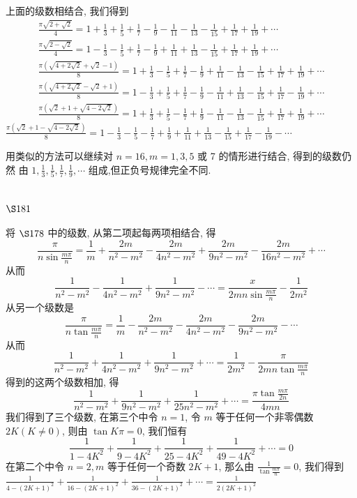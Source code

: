 上面的级数相结合, 我们得到
\[
\begin{gathered}
\frac{\pi \sqrt{2+\sqrt{2}}}{4}=1+\frac{1}{3}+\frac{1}{5}+\frac{1}{7}-\frac{1}{9}-\frac{1}{11}-\frac{1}{13}-\frac{1}{15}+\frac{1}{17}+\frac{1}{19}+\cdots \\
\frac{\pi \sqrt{2-\sqrt{2}}}{4}=1-\frac{1}{3}-\frac{1}{5}+\frac{1}{7}-\frac{1}{9}+\frac{1}{11}+\frac{1}{13}-\frac{1}{15}+\frac{1}{17}+\frac{1}{19}+\cdots \\
\frac{\pi(\sqrt{4+2 \sqrt{2}}+\sqrt{2}-1)}{8}=1+\frac{1}{3}-\frac{1}{5}+\frac{1}{7}-\frac{1}{9}+\frac{1}{11}-\frac{1}{13}-\frac{1}{15}+\frac{1}{17}+\frac{1}{19}+\cdots \\
\frac{\pi(\sqrt{4+2 \sqrt{2}}-\sqrt{2}+1)}{8}=1-\frac{1}{3}+\frac{1}{5}+\frac{1}{7}-\frac{1}{9}-\frac{1}{11}+\frac{1}{13}-\frac{1}{15}+\frac{1}{17}-\frac{1}{19}+\cdots \\
\frac{\pi(\sqrt{2}+1+\sqrt{4-2 \sqrt{2}})}{8}=1+\frac{1}{3}+\frac{1}{5}-\frac{1}{7}+\frac{1}{9}-\frac{1}{11}-\frac{1}{13}-\frac{1}{15}+\frac{1}{17}+\frac{1}{19}+\cdots
\end{gathered}
\]
$\frac{\pi(\sqrt{2}+1-\sqrt{4-2 \sqrt{2}})}{8}=1-\frac{1}{3}-\frac{1}{5}-\frac{1}{7}+\frac{1}{9}+\frac{1}{11}+\frac{1}{13}-\frac{1}{15}+\frac{1}{17}-\frac{1}{19}-\cdots$

用类似的方法可以继续对 $n=16, m=1,3,5$ 或 7 的情形进行结合, 得到的级数仍然 由 $1, \frac{1}{3}, \frac{1}{5}, \frac{1}{7}, \frac{1}{9}, \cdots$ 组成,但正负号规律完全不同.

\section{$\S 181$}

将 $\S 178$ 中的级数, 从第二项起每两项相结合, 得
\[
\frac{\pi}{n \sin \frac{m \pi}{n}}=\frac{1}{m}+\frac{2 m}{n^{2}-m^{2}}-\frac{2 m}{4 n^{2}-m^{2}}+\frac{2 m}{9 n^{2}-m^{2}}-\frac{2 m}{16 n^{2}-m^{2}}+\cdots
\]
从而
\[
\frac{1}{n^{2}-m^{2}}-\frac{1}{4 n^{2}-m^{2}}+\frac{1}{9 n^{2}-m^{2}}-\cdots=\frac{x}{2 m n \sin \frac{m \pi}{n}}-\frac{1}{2 m^{2}}
\]
从另一个级数是
\[
\frac{\pi}{n \tan \frac{m \pi}{n}}=\frac{1}{m}-\frac{2 m}{n^{2}-m^{2}}-\frac{2 m}{4 n^{2}-m^{2}}-\frac{2 m}{9 n^{2}-m^{2}}-\cdots
\]
从而
\[
\frac{1}{n^{2}-m^{2}}+\frac{1}{4 n^{2}-m^{2}}+\frac{1}{9 n^{2}-m^{2}}+\cdots=\frac{1}{2 m^{2}}-\frac{\pi}{2 m n \tan \frac{m \pi}{n}}
\]
得到的这两个级数相加, 得
\[
\frac{1}{n^{2}-m^{2}}+\frac{1}{9 n^{2}-m^{2}}+\frac{1}{25 n^{2}-m^{2}}+\cdots=\frac{\pi \tan \frac{m \pi}{2 n}}{4 m n}
\]
我们得到了三个级数, 在第三个中令 $n=1$, 令 $m$ 等于任何一个非零偶数 $2 K(K \neq 0)$, 则由 $\tan K \pi=0$, 我们恒有
\[
\frac{1}{1-4 K^{2}}+\frac{1}{9-4 K^{2}}+\frac{1}{25-4 K^{2}}+\frac{1}{49-4 K^{2}}+\cdots=0
\]
在第二个中令 $n=2, m$ 等于任何一个奇数 $2 K+1$, 那么由 $\frac{1}{\tan \frac{m \pi}{n}}=0$, 我们得到 $\frac{1}{4-(2 K+1)^{2}}+\frac{1}{16-(2 K+1)^{2}}+\frac{1}{36-(2 K+1)^{2}}+\cdots=\frac{1}{2(2 K+1)^{2}}$ 

